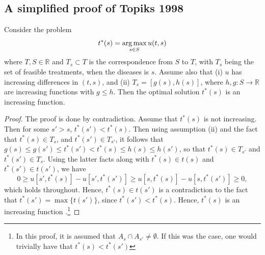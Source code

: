 \documentclass[10pt,a4paper]{article} 					%
\begin{document}
\begin{appendices}
\subsection{A simplified proof of Topiks 1998}
\begin{thm}
	Consider the problem
	\[
		t^*(s)=\argmax_{s\in S} u(t,s)
	\]
	where $T,S\in \mathbb{R}$ and $T_s\subset T$ is the correspondence from $S$ to $T$, with $T_s$ being the set of feasible treatments, when the diseases is $s$. Assume also that (i) $u$ has increasing differences in $(t,s)$, and (ii) $T_s=[g(s),h(s)]$, where $h,g:S \rightarrow \mathbb{R}$ are increasing functions with $g\leq h$. Then the optimal solution $t^*(s)$ is an increasing function.
\end{thm}

\begin{proof}
	The proof is done by contradiction. Assume that $t^*(s)$ is not increasing. Then for some $s'>s$, $t^*(s')<t^*(s)$. Then using assumption (ii) and the fact that $t^*(s)\in T_s$, and $t^*(s')\in T_{s'}$, it follows that $g(s)\leq g(s')\leq t^*(s') < t^*(s) \leq h(s) \leq h(s')$, so that $t^*(s)\in T_{s'}$ and $t^*(s')\in T_s$. Using the latter facts along with $t^*(s)\in t(s)$ and $t^*(s')\in t(s')$, we have 
	\[
		0\geq u[s',t^*(s)]-u[s',t^*(s')]\geq u[s,t^*(s)]-u[s,t^*(s')]\geq 0,
	\]
which holds throughout. Hence, $t^*(s)\in t(s')$ is a contradiction to the fact that $t^*(s')=\max \{t(s')\}$, since $t^*(s')<t^*(s)$. Hence, $t^*(s)$ is an increasing function \parencite{Amir2005a}.\footnote{In this proof, it is assumed that $A_s\cap A_{s'}\ne \emptyset$. If this was the case, one would trivially have that $t^*(s)<t^*(s')$}
\end{proof}
\end{appendices}
\end{document}
